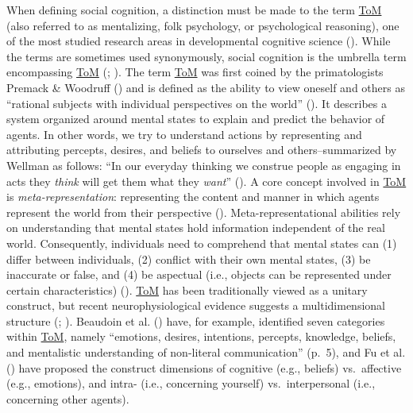 \documentclass[
]{scrbook}
\begin{document}
When defining social cognition, a distinction must be made to the term \hyperref[acronyms_ToM]{ToM} (also referred to as mentalizing, folk psychology, or psychological reasoning), one of the most studied research areas in developmental cognitive science (). While the terms are sometimes used synonymously, social cognition is the umbrella term encompassing \hyperref[acronyms_ToM]{ToM} (; ). The term \hyperref[acronyms_ToM]{ToM} was first coined by the primatologists Premack \& Woodruff () and is defined as the ability to view oneself and others as ``rational subjects with individual perspectives on the world'' (). It describes a system organized around mental states to explain and predict the behavior of agents. In other words, we try to understand actions by representing and attributing percepts, desires, and beliefs to ourselves and others\thinspace --\thinspace summarized by Wellman as follows: ``In our everyday thinking we construe people as engaging in acts they \emph{think} will get them what they \emph{want}'' (). A core concept involved in \hyperref[acronyms_ToM]{ToM} is \emph{meta-representation}: representing the content and manner in which agents represent the world from their perspective (). Meta-representational abilities rely on understanding that mental states hold information independent of the real world. Consequently, individuals need to comprehend that mental states can (1) differ between individuals, (2) conflict with their own mental states, (3) be inaccurate or false, and (4) be aspectual (i.e., objects can be represented under certain characteristics) (). \hyperref[acronyms_ToM]{ToM} has been traditionally viewed as a unitary construct, but recent neurophysiological evidence suggests a multidimensional structure (; ). Beaudoin et al. () have, for example, identified seven categories within \hyperref[acronyms_ToM]{ToM}, namely ``emotions, desires, intentions, percepts, knowledge, beliefs, and mentalistic understanding of non-literal communication'' (p.~5), and Fu et al. () have proposed the construct dimensions of cognitive (e.g., beliefs) vs.~affective (e.g., emotions), and intra- (i.e., concerning yourself) vs.~interpersonal (i.e., concerning other agents).
\end{document}
